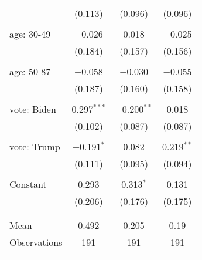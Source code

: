 \begin{tabular}{@{\extracolsep{5pt}}lccc}
  & (0.113) & (0.096) & (0.096) \\ 
  & & & \\ 
 age: 30-49 & $-$0.026 & 0.018 & $-$0.025 \\ 
  & (0.184) & (0.157) & (0.156) \\ 
  & & & \\ 
 age: 50-87 & $-$0.058 & $-$0.030 & $-$0.055 \\ 
  & (0.187) & (0.160) & (0.158) \\ 
  & & & \\ 
 vote: Biden & 0.297$^{***}$ & $-$0.200$^{**}$ & 0.018 \\ 
  & (0.102) & (0.087) & (0.087) \\ 
  & & & \\ 
 vote: Trump & $-$0.191$^{*}$ & 0.082 & 0.219$^{**}$ \\ 
  & (0.111) & (0.095) & (0.094) \\ 
  & & & \\ 
 Constant & 0.293 & 0.313$^{*}$ & 0.131 \\ 
  & (0.206) & (0.176) & (0.175) \\ 
  & & & \\ 
\hline \\[-1.8ex] 
Mean & 0.492 & 0.205 & 0.19 \\ 
Observations & 191 & 191 & 191 \\ 
\hline 
\hline \\[-1.8ex] 
\end{tabular} 
